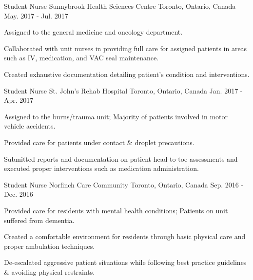 \begin{cventries}
  \cventry
    {Student Nurse} %
    {Sunnybrook Health Sciences Centre} %
    {Toronto, Ontario, Canada} %
    {May. 2017 - Jul. 2017} %
    {
      \begin{cvitems} %
        \item {Assigned to the general medicine and oncology department.}
        \item {Collaborated with unit nurses in providing full care for assigned patients in areas such as IV, medication, and VAC seal maintenance.}
        \item {Created exhaustive documentation detailing patient's condition and interventions.}
      \end{cvitems}
    }

  \cventry
    {Student Nurse} %
    {St. John's Rehab Hospital} %
    {Toronto, Ontario, Canada} %
    {Jan. 2017 - Apr. 2017} %
    {
      \begin{cvitems} %
        \item {Assigned to the burns/trauma unit; Majority of patients involved in motor vehicle accidents.}
        \item {Provided care for patients under contact \& droplet precautions.}
        \item {Submitted reports and documentation on patient head-to-toe assessments and executed proper interventions such as medication administration.}
      \end{cvitems}
    }

  \cventry
    {Student Nurse} %
    {Norfinch Care Community} %
    {Toronto, Ontario, Canada} %
    {Sep. 2016 - Dec. 2016} %
    {
      \begin{cvitems} %
        \item {Provided care for residents with mental health conditions; Patients on unit suffered from dementia.}
        \item {Created a comfortable environment for residents through basic physical care and proper ambulation techniques.}
        \item {De-escalated aggressive patient situations while following best practice guidelines \& avoiding physical restraints.}
      \end{cvitems}
    }


\end{cventries}
